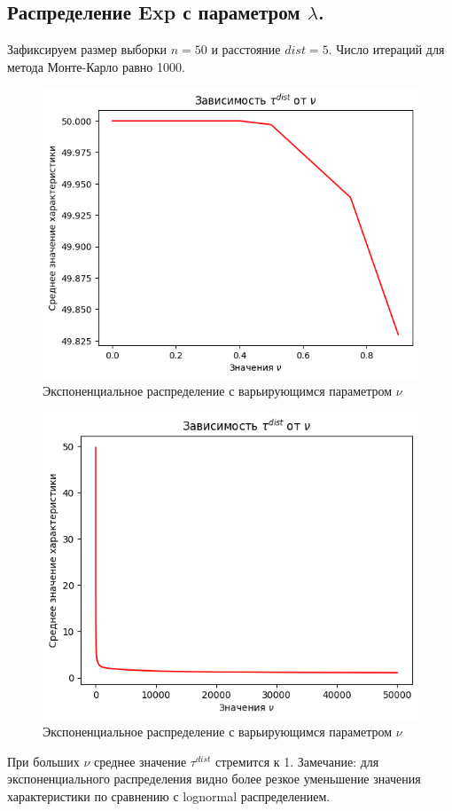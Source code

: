 \documentclass{report}
\begin{document}
\subsection{Распределение Exp с параметром $\lambda$.}
Зафиксируем размер выборки $n = 50$ и расстояние $dist = 5$. Число итераций для метода Монте-Карло равно 1000.
\begin{figure}[h]
    \centering
    \includegraphics[width=0.5\linewidth]{7.png}
    \caption{Экспоненциальное распределение с варьирующимся параметром $\nu$}
\end{figure}
\begin{figure}[h]
    \centering
    \includegraphics[width=0.5\linewidth]{8.png}
    \caption{Экспоненциальное распределение с варьирующимся параметром $\nu$}
\end{figure}
\newline
\newline
При больших $\nu$ среднее значение $\tau^{dist}$ стремится к 1.
\newline
\newline
Замечание: для экспоненциального распределения видно более резкое уменьшение значения характеристики по сравнению с lognormal распределением.
\end{document}
